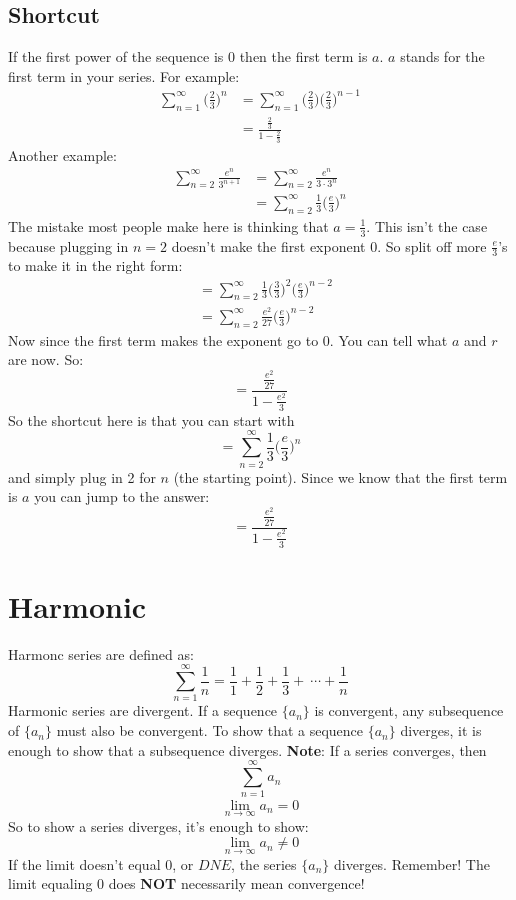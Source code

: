 \documentclass{article}
\begin{document}
    \subsection{Shortcut}
        If the first power of the sequence is 0 then the first term is \(a\). \(a\) stands for the first term in your series.
        For example:
        \begin{align*}
            \sum_{n=1}^{\infty} \Big ( \frac{2}{3} \Big )^n & = \sum_{n=1}^{\infty} \Big ( \frac{2}{3} \Big )\Big ( \frac{2}{3} \Big )^{n-1} \\
            & = \frac{\frac{2}{3}}{1-\frac{2}{3}}
        \end{align*}
        Another example:
        \begin{align*}
            \sum_{n=2}^{\infty} \frac{e^n}{3^{n+1}} & = \sum_{n=2}^{\infty} \frac{e^n}{3\cdot 3^n} \\
            & = \sum_{n=2}^{\infty} \frac{1}{3} \Big( \frac{e}{3}\Big)^n
        \end{align*}
        The mistake most people make here is thinking that \(a = \frac{1}{3}\). This isn't the case because plugging in \(n=2\) doesn't make the first exponent 0. So split off more \(\frac{e}{3}\)'s to make it in the right form:
        \begin{align*}
            & = \sum_{n=2}^{\infty} \frac{1}{3} \Big( \frac{3}{3} \Big)^2 \Big( \frac{e}{3} \Big) ^{n-2} \\
            & = \sum_{n=2}^{\infty} \frac{e^2}{27} \Big( \frac{e}{3} \Big) ^{n-2}
        \end{align*}
        Now since the first term makes the exponent go to 0. You can tell what \(a\) and \(r\) are now. So:
        \[= \frac{ \frac{e^2}{27} }{1- \frac{e^2}{3}}\]
        So the shortcut here is that you can start with
        \[= \sum_{n=2}^{\infty} \frac{1}{3} \Big( \frac{e}{3}\Big)^n\]
        and simply plug in 2 for \(n\) (the starting point). Since we know that the first term is \(a\) you can jump to the answer:
        \[= \frac{ \frac{e^2}{27} }{1- \frac{e^2}{3}}\]

\section{Harmonic}
    Harmonc series are defined as:
    \[\sum_{n=1}^{\infty} \frac{1}{n} = \frac{1}{1} + \frac{1}{2} + \frac{1}{3} +\ \cdots + \frac{1}{n}\]
    Harmonic series are divergent. If a sequence \(\{a_n\}\) is convergent, any subsequence of \(\{a_n\}\) must also be convergent. To show that a sequence \(\{a_n\}\) diverges, it is enough to show that a subsequence diverges.
    \textbf{Note}: If a series converges, then
    \[\sum_{n=1}^{\infty} a_n\]
    \[\lim_{n \rightarrow \infty}^{} a_n = 0\]
    So to show a series diverges, it's enough to show:
    \[\lim_{n \rightarrow \infty} a_n \neq 0\]
    If the limit doesn't equal 0, or \(DNE\), the series \(\{a_n\}\) diverges.
    Remember! The limit equaling 0 does \textbf{NOT} necessarily mean convergence!
\end{document}
